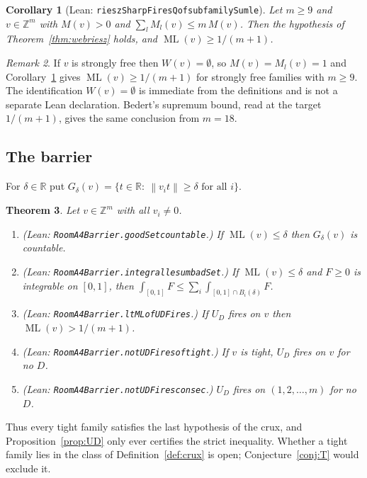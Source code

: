 \documentclass[11pt]{amsart}
\theoremstyle{plain}
\newtheorem{theorem}{Theorem}[section]
\newtheorem{corollary}[theorem]{Corollary}
\theoremstyle{definition}
\theoremstyle{remark}
\newtheorem{remark}[theorem]{Remark}
\newcommand{\nrm}[1]{\left\lVert #1 \right\rVert}
\newcommand{\ML}{\operatorname{ML}}
\newcommand{\Z}{\mathbb{Z}}
\newcommand{\R}{\mathbb{R}}
\newcommand{\lean}[1]{{\def\_{\textunderscore\allowbreak}\def\.{.\allowbreak}\texttt{#1}}}
\begin{document}
\begin{corollary}[Lean: \lean{rieszSharpFiresQ\_of\_subfamilySum\_le}]\label{cor:web}
Let $m\ge9$ and $v\in\Z^m$ with $M(v)>0$ and $\sum_lM_l(v)\le m\,M(v)$. Then the hypothesis of
Theorem~\ref{thm:webriesz} holds, and $\ML(v)\ge1/(m+1)$.
\end{corollary}

\begin{remark}
If $v$ is strongly free then $W(v)=\emptyset$, so $M(v)=M_l(v)=1$ and Corollary~\ref{cor:web}
gives $\ML(v)\ge 1/(m+1)$ for strongly free families with $m\ge 9$. The identification
$W(v)=\emptyset$ is immediate from the definitions and is not a separate Lean declaration.
Bedert's supremum bound, read at the target $1/(m+1)$, gives the same conclusion from $m=18$.
\end{remark}

\subsection{The barrier}
For $\delta\in\R$ put $G_\delta(v)=\{t\in\R:\ \nrm{v_it}\ge\delta\text{ for all }i\}$.

\begin{theorem}\label{thm:barrier}
Let $v\in\Z^m$ with all $v_i\ne0$.
\begin{enumerate}
\item (Lean: \lean{RoomA4Barrier\.goodSet\_countable}.) If $\ML(v)\le\delta$ then $G_\delta(v)$ is
countable.
\item (Lean: \lean{RoomA4Barrier\.integral\_le\_sum\_badSet}.) If $\ML(v)\le\delta$ and $F\ge0$ is
integrable on $[0,1]$, then $\int_{[0,1]}F\le\sum_i\int_{[0,1]\cap B_i(\delta)}F$.
\item (Lean: \lean{RoomA4Barrier\.lt\_ML\_of\_UDFires}.) If $U_D$ fires on $v$ then
$\ML(v)>1/(m+1)$.
\item (Lean: \lean{RoomA4Barrier\.not\_UDFires\_of\_tight}.) If $v$ is tight, $U_D$ fires on $v$
for no $D$.
\item (Lean: \lean{RoomA4Barrier\.not\_UDFires\_consec}.) $U_D$ fires on $(1,2,\dots,m)$ for no $D$.
\end{enumerate}
\end{theorem}

Thus every tight family satisfies the last hypothesis of the crux, and Proposition~\ref{prop:UD}
only ever certifies the strict inequality. Whether a tight family lies in the class of
Definition~\ref{def:crux} is open; Conjecture~\ref{conj:T} would exclude it.
\end{document}
